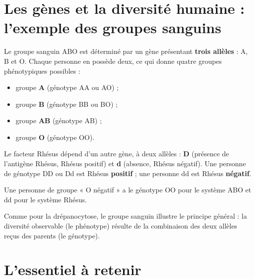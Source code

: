 \section{Les gènes et la diversité humaine : l'exemple des groupes sanguins}

\begin{propriete}
Le groupe sanguin ABO est déterminé par un gène présentant \textbf{trois allèles} : A,
B et O. Chaque personne en possède deux, ce qui donne quatre groupes phénotypiques
possibles :
\begin{itemize}
\item groupe \textbf{A} (génotype AA ou AO) ;
\item groupe \textbf{B} (génotype BB ou BO) ;
\item groupe \textbf{AB} (génotype AB) ;
\item groupe \textbf{O} (génotype OO).
\end{itemize}
\end{propriete}

\begin{propriete}
Le facteur Rhésus dépend d'un autre gène, à deux allèles : \textbf{D} (présence de
l'antigène Rhésus, Rhésus positif) et \textbf{d} (absence, Rhésus négatif). Une personne
de génotype DD ou Dd est Rhésus \textbf{positif} ; une personne dd est Rhésus
\textbf{négatif}.
\end{propriete}

\begin{exemple}
Une personne de groupe « O négatif » a le génotype OO pour le système ABO et dd pour le
système Rhésus.
\end{exemple}

\begin{remarque}
Comme pour la drépanocytose, le groupe sanguin illustre le principe général : la
diversité observable (le phénotype) résulte de la combinaison des deux allèles reçus
des parents (le génotype).
\end{remarque}

\section{L'essentiel à retenir}

